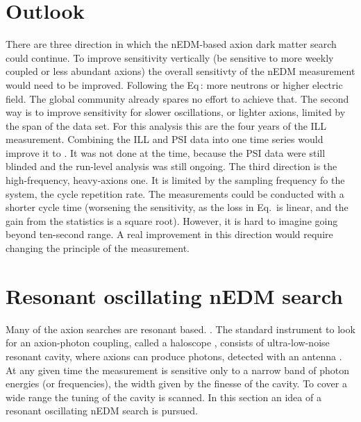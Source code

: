 \section{Outlook}
There are three direction in which the nEDM-based axion dark matter search could continue.
To improve sensitivity vertically (be sensitive to more weekly coupled or less abundant axions) the overall sensitivty of the nEDM measurement would need to be improved.
Following the Eq\,: more neutrons or higher electric field.
The global community already spares no effort to achieve that.
The second way is to improve sensitivity for slower oscillations, or lighter axions, limited by the span of the data set. For this analysis this are the four years of the ILL measurement. Combining the ILL and PSI data into one time series would improve it to . It was not done at the time, because the PSI data were still blinded and the run-level analysis was still ongoing.
The third direction is the high-frequency, heavy-axions one. It is limited by the sampling frequency fo the system, the cycle repetition rate. The measurements could be conducted with a shorter cycle time (worsening the sensitivity, as the loss in Eq.\, is linear, and the gain from the statistics is a square root).
However, it is hard to imagine going beyond ten-second range. A real improvement in this direction would require changing the principle of the measurement.




\section{Resonant oscillating nEDM search}
Many of the axion searches are resonant based. .
The standard instrument to look for an axion-photon coupling, called a haloscope , consists of ultra-low-noise resonant cavity, where axions can produce photons, detected with an antenna .
At any given time the measurement is sensitive only to a narrow band of photon energies (or frequencies), the width given by the finesse  of the cavity. To cover a wide range the tuning of the cavity is scanned. In this section an idea of a resonant oscillating nEDM search is pursued.

